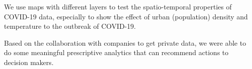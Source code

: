 We use maps with different layers to test the spatio-temporal properties of COVID-19 data, especially to show the effect of urban (population) density and temperature to the outbreak of COVID-19.


Based on the collaboration with companies to get private data, we were able to do some meaningful prescriptive analytics that can recommend actions to decision makers.














